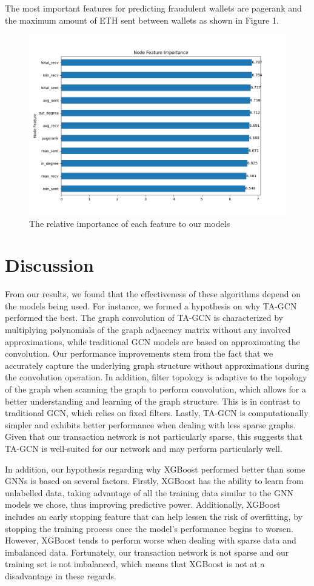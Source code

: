 \documentclass{article}
\begin{document}
    The most important features for predicting fraudulent wallets are pagerank and the maximum amount of ETH sent between wallets as shown in Figure 1.

\begin{figure}[h]
	\centering
	\includegraphics[width=0.8\linewidth]{images/tagcn_feat_imp.png}
	\caption{The relative importance of each feature to our models}
\end{figure}
    
\section{Discussion}
    From our results, we found that the effectiveness of these algorithms depend on the models being used. For instance, we formed a hypothesis on why TA-GCN performed the best. The graph convolution of TA-GCN is characterized by multiplying polynomials of the graph adjacency matrix without any involved approximations, while traditional GCN models are based on approximating the convolution. Our performance improvements stem from the fact that we accurately capture the underlying graph structure without approximations during the convolution operation. In addition, filter topology is adaptive to the topology of the graph when scanning the graph to perform convolution, which allows for a better understanding and learning of the graph structure. This is in contrast to traditional GCN, which relies on fixed filters. Lastly, TA-GCN is computationally simpler and exhibits better performance when dealing with less sparse graphs. Given that our transaction network is not particularly sparse, this suggests that TA-GCN is well-suited for our network and may perform particularly well. 

    In addition, our hypothesis regarding why XGBoost performed better than some GNNs is based on several factors. Firstly, XGBoost has the ability to learn from unlabelled data, taking advantage of all the training data similar to the GNN models we chose, thus improving predictive power. Additionally, XGBoost includes an early stopping feature that can help lessen the risk of overfitting, by stopping the training process once the model’s performance begins to worsen. However, XGBoost tends to perform worse when dealing with sparse data and imbalanced data. Fortunately, our transaction network is not sparse and our training set is not imbalanced, which means that XGBoost is not at a disadvantage in these regards. 
\end{document}
